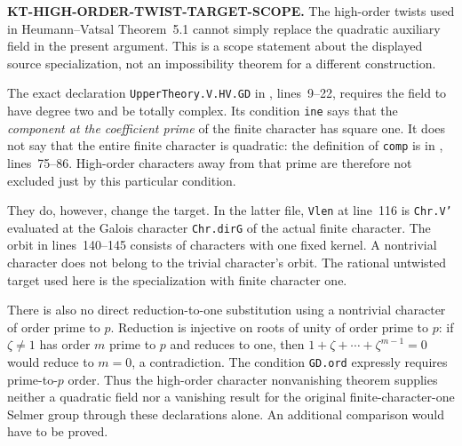 \documentclass[11pt,a4paper]{article}
\theoremstyle{definition}
\renewcommand{\paragraph}[1]{\par\smallskip\noindent\textbf{#1}\quad\ignorespaces}
\begin{document}


\paragraph{KT-HIGH-ORDER-TWIST-TARGET-SCOPE.}
The high-order twists used in Heumann--Vatsal Theorem~5.1
cannot simply replace the quadratic auxiliary field in the present
argument. This is a scope statement about the displayed source
specialization, not an impossibility theorem for a different construction.

The exact declaration \texttt{UpperTheory.V.HV.GD} in
, lines~9--22, requires
the field to have degree two and be totally complex. Its condition
\texttt{ine} says that the \emph{component at the coefficient prime}
of the finite character has square one. It does not say that the
entire finite character is quadratic: the definition of
\texttt{comp} is in
,
lines~75--86. High-order characters away from that prime are
therefore not excluded just by this particular condition.

They do, however, change the target. In the latter file,
\texttt{Vlen} at line~116 is
\texttt{Chr.V'} evaluated at the Galois character
\texttt{Chr.dirG} of the actual finite character. The orbit in
lines~140--145 consists of characters with one fixed kernel.
A nontrivial character does not belong to the trivial character's
orbit. The rational untwisted target used here is the
specialization with finite character one.

There is also no direct reduction-to-one substitution using a
nontrivial character of order prime to $p$. Reduction is injective
on roots of unity of order prime to $p$: if $\zeta\ne1$ has
order $m$ prime to $p$ and reduces to one, then
$1+\zeta+\cdots+\zeta^{m-1}=0$ would reduce to $m=0$,
a contradiction. The condition \texttt{GD.ord} expressly
requires prime-to-$p$ order. Thus the high-order character
nonvanishing theorem supplies neither a quadratic field nor a
vanishing result for the original finite-character-one Selmer
group through these declarations alone. An additional comparison
would have to be proved.



\end{document}
